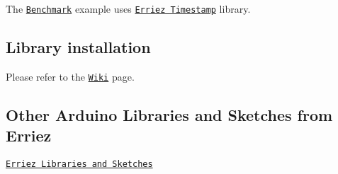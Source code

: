 \begin{DoxyItemize}
\item The \href{https://github.com/Erriez/ErriezTM1638/blob/master/examples/Benchmark/Benchmark.ino}{\tt Benchmark} example uses \href{https://github.com/Erriez/ErriezTimestamp}{\tt Erriez Timestamp} library.
\end{DoxyItemize}

\subsection*{Library installation}

Please refer to the \href{https://github.com/Erriez/ErriezArduinoLibrariesAndSketches/wiki}{\tt Wiki} page.

\subsection*{Other Arduino Libraries and Sketches from Erriez}


\begin{DoxyItemize}
\item \href{https://github.com/Erriez/ErriezArduinoLibrariesAndSketches}{\tt Erriez Libraries and Sketches} 
\end{DoxyItemize}
